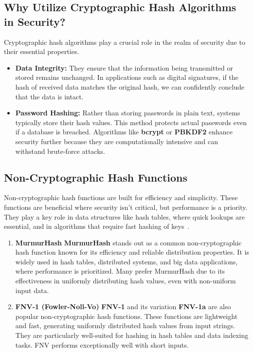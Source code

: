 \documentclass[11pt,a4paper]{article}
\begin{document}
    \subsection*{Why Utilize Cryptographic Hash Algorithms in Security?}
    Cryptographic hash algorithms play a crucial role in the realm of security due to their essential properties.
        \begin{itemize}
            \item \textbf{Data Integrity:} They ensure that the information being transmitted or stored remains unchanged. In applications such as digital signatures, if the hash of received data matches the original hash, we can confidently conclude that the data is intact.

            \item \textbf{Password Hashing:} Rather than storing passwords in plain text, systems typically store their hash values. This method protects actual passwords even if a database is breached. Algorithms like \textbf{bcrypt} or \textbf{PBKDF2} enhance security further because they are computationally intensive and can withstand brute-force attacks.

        \end{itemize}

    \subsection*{Non-Cryptographic Hash Functions}
    Non-cryptographic hash functions are built for efficiency and simplicity. These functions are beneficial where security isn’t critical, but performance is a priority. They play a key role in data structures like hash tables, where quick lookups are essential, and in algorithms that require fast hashing of keys~\cite{non-Cryptographic}.
        \begin{enumerate}
            \item \textbf{MurmurHash}
            \newline
            \textbf{MurmurHash} stands out as a common non-cryptographic hash function known for its efficiency and reliable distribution properties. It is widely used in hash tables, distributed systems, and big data applications, where performance is prioritized. Many prefer MurmurHash due to its effectiveness in uniformly distributing hash values, even with non-uniform input data.

            \item \textbf{FNV-1 (Fowler-Noll-Vo)}
            \newline
            \textbf{FNV-1} and its variation \textbf{FNV-1a} are also popular non-cryptographic hash functions. These functions are lightweight and fast, generating uniformly distributed hash values from input strings. They are particularly well-suited for hashing in hash tables and data indexing tasks. FNV performs exceptionally well with short inputs.

        \end{enumerate}
\end{document}
